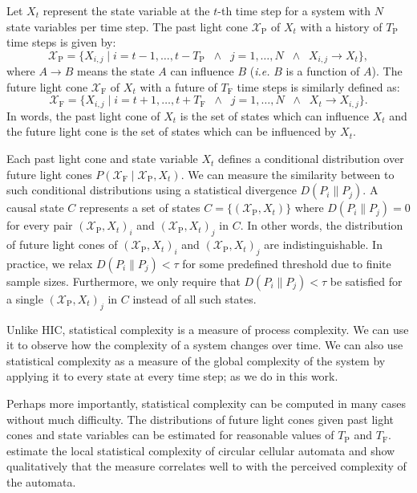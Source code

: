 Let $X_t$ represent the state variable at the $t$-th time step for a system
with $N$ state variables per time step. The past light cone
$\mathcal{X}_{\textrm{P}}$ of $X_t$ with a history of $T_{\textrm{P}}$ time
steps is given by:
\begin{equation}
    \mathcal{X}_{\textrm{P}} =
        \{X_{i, j} \mid i = t - 1, \ldots, t - T_{\textrm{P}}
            \;\;\land\;\; j = 1, \ldots, N
            \;\;\land\;\; X_{i, j} \rightarrow X_t \},
\end{equation}
where $A \rightarrow B$ means the state $A$ can influence $B$ (\emph{i.e.} $B$
is a function of $A$). The future light cone $\mathcal{X}_{\textrm{F}}$ of
$X_t$ with a future of $T_{\textrm{F}}$ time steps is similarly defined as:
\begin{equation}
    \mathcal{X}_{\textrm{F}} =
        \{X_{i, j} \mid i = t + 1, \ldots, t + T_{\textrm{F}}
            \;\;\land\;\; j = 1, \ldots, N
            \;\;\land\;\; X_t \rightarrow X_{i, j} \}.
\end{equation}
In words, the past light cone of $X_t$ is the set of states which can influence
$X_t$ and the future light cone is the set of states which can be influenced by
$X_t$.

Each past light cone and state variable $X_t$ defines a conditional
distribution over future light cones $P(\mathcal{X}_{\textrm{F}} \mid
\mathcal{X}_{\textrm{P}}, X_t)$. We can measure the similarity between to such
conditional distributions using a statistical divergence $D(P_i \| P_j)$. A
causal state $C$ represents a set of states $C = \{(\mathcal{X}_{\textrm{P}},
X_t)\}$ where $D(P_i \| P_j) = 0$ for every pair $(\mathcal{X}_{\textrm{P}},
X_t)_i$ and $(\mathcal{X}_{\textrm{P}}, X_t)_j$ in $C$. In other words, the
distribution of future light cones of $(\mathcal{X}_{\textrm{P}}, X_t)_i$ and
$(\mathcal{X}_{\textrm{P}}, X_t)_j$ are indistinguishable. In practice, we
relax $D(P_i \| P_j) < \tau$ for some predefined threshold due to finite
sample sizes. Furthermore, we only require that $D(P_i \| P_j) < \tau$ be
satisfied for a single $(\mathcal{X}_{\textrm{P}}, X_t)_j$ in $C$ instead of
all such states.

Unlike HIC, statistical complexity is a measure of process complexity. We can
use it to observe how the complexity of a system changes over time. We can also
use statistical complexity as a measure of the global complexity of the system
by applying it to every state at every time step; as we do in this work.

Perhaps more importantly, statistical complexity can be computed in many
cases without much difficulty. The distributions of future light cones given
past light cones and state variables can be estimated for reasonable values of
$T_\textrm{P}$ and $T_\textrm{F}$. \citet{shalizi2004quantifying} estimate the
local statistical complexity of circular cellular automata and show
qualitatively that the measure correlates well to with the perceived complexity
of the automata.
